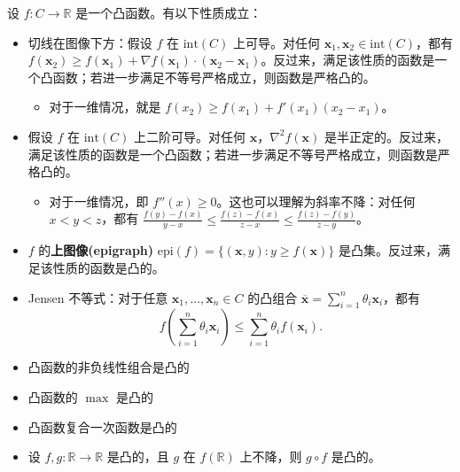 \begin{property}
    设 $f:C\to \mathbb R$ 是一个凸函数。有以下性质成立：
    \begin{itemize}
        \item 切线在图像下方：假设 $f$ 在 $\mathrm{int}(C)$ 上可导。对任何 $\mathbf x_1,\mathbf x_2\in \mathrm{int}(C)$，都有 $f(\mathbf x_2)\ge f(\mathbf x_1)+\nabla f(\mathbf x_1)\cdot (\mathbf x_2-\mathbf x_1)$。反过来，满足该性质的函数是一个凸函数；若进一步满足不等号严格成立，则函数是严格凸的。
        \begin{itemize}
            \item 对于一维情况，就是 $f(x_2)\ge f(x_1)+f'(x_1)(x_2-x_1)$。
        \end{itemize}
        \item 假设 $f$ 在 $\mathrm{int}(C)$ 上二阶可导。对任何 $\mathbf x$，$\nabla^2 f(\mathbf x)$ 是半正定的。反过来，满足该性质的函数是一个凸函数；若进一步满足不等号严格成立，则函数是严格凸的。
        \begin{itemize}
            \item 对于一维情况，即 $f''(x)\ge 0$。这也可以理解为斜率不降：对任何 $x<y<z$，都有 $\frac{f(y)-f(x)}{y-x}\le \frac{f(z)-f(x)}{z-x}\le \frac{f(z)-f(y)}{z-y}$。
        \end{itemize}
        \item $f$ 的\textbf{上图像(epigraph)} $\mathrm{epi}(f)=\{(\mathbf x,y):y\ge f(\mathbf x)\}$ 是凸集。反过来，满足该性质的函数是凸的。
        \item Jensen 不等式：对于任意 $\mathbf x_1,\ldots,\mathbf x_n\in C$ 的凸组合 $\overline{\mathbf x}=\sum_{i=1}^n \theta_i \mathbf x_i$，都有
        $$
        f\left(\sum_{i=1}^n \theta_i \mathbf x_i\right)\le \sum_{i=1}^n \theta_i f(\mathbf x_i).
        $$
    \end{itemize}
\end{property}

\begin{property}
    \begin{itemize}
        \item 凸函数的非负线性组合是凸的
        \item 凸函数的 $\max$ 是凸的
        \item 凸函数复合一次函数是凸的
        \item 设 $f,g:\mathbb R\to \mathbb R$ 是凸的，且 $g$ 在 $f(\mathbb R)$ 上不降，则 $g\circ f$ 是凸的。
    \end{itemize}
\end{property}

